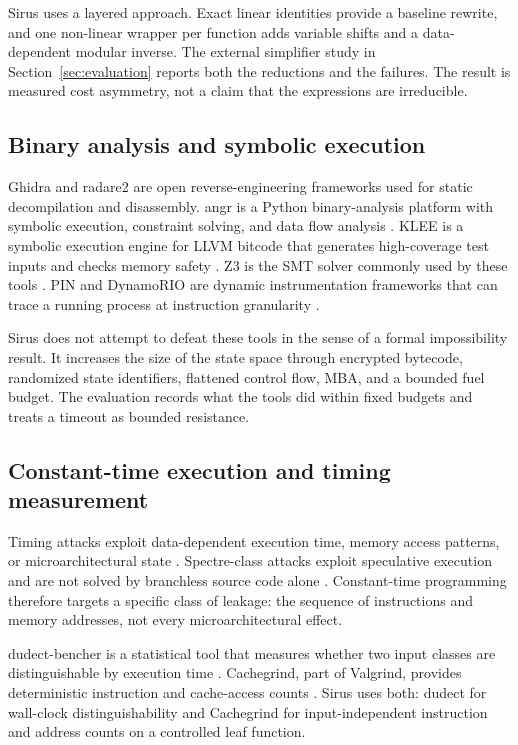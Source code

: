 Sirus uses a layered approach. Exact linear identities provide a baseline
rewrite, and one non-linear wrapper per function adds variable shifts and a
data-dependent modular inverse. The external simplifier study in
Section~\ref{sec:evaluation} reports both the reductions and the failures. The
result is measured cost asymmetry, not a claim that the expressions are
irreducible.

\subsection{Binary analysis and symbolic execution}

Ghidra \cite{ghidra} and radare2 \cite{radare2} are open reverse-engineering
frameworks used for static decompilation and disassembly. angr is a Python
binary-analysis platform with symbolic execution, constraint solving, and data
flow analysis \cite{shoshitaishvili2016angr}. KLEE is a symbolic execution engine
for LLVM bitcode that generates high-coverage test inputs and checks memory
safety \cite{cadar2008klee}. Z3 is the SMT solver commonly used by these tools
\cite{z3_2008}. PIN and DynamoRIO are dynamic instrumentation frameworks that can
trace a running process at instruction granularity \cite{pin2005}.

Sirus does not attempt to defeat these tools in the sense of a formal
impossibility result. It increases the size of the state space through encrypted
bytecode, randomized state identifiers, flattened control flow, MBA, and a
bounded fuel budget. The evaluation records what the tools did within fixed
budgets and treats a timeout as bounded resistance.

\subsection{Constant-time execution and timing measurement}

Timing attacks exploit data-dependent execution time, memory access patterns, or
microarchitectural state \cite{kocher1996,bernstein2005}. Spectre-class attacks
exploit speculative execution and are not solved by branchless source code
alone \cite{kocher2019spectre}. Constant-time programming therefore targets a
specific class of leakage: the sequence of instructions and memory addresses,
not every microarchitectural effect.

dudect-bencher is a statistical tool that measures whether two input classes are
distinguishable by execution time \cite{reparaz2017dudect}. Cachegrind, part of
Valgrind, provides deterministic instruction and cache-access counts
\cite{nethercote2007valgrind}. Sirus uses both: dudect for wall-clock
distinguishability and Cachegrind for input-independent instruction and address
counts on a controlled leaf function.

